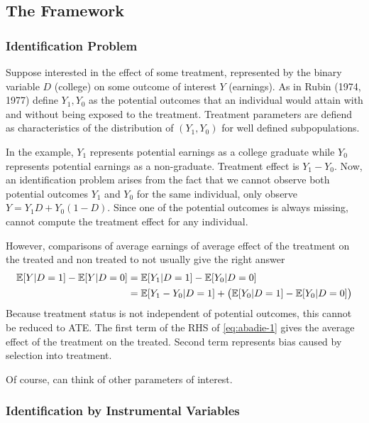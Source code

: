 \subsection{The Framework}
\subsubsection{Identification Problem}

Suppose interested in the effect of some treatment, represented by the binary variable $D$ (college) on some outcome of interest $Y$ (earnings). As in Rubin (1974, 1977) define $Y_1, Y_0$ as the potential outcomes that an individual would attain with and without being exposed to the treatment. Treatment parameters are defiend as characteristics of the distribution of $(Y_1, Y_0)$ for well defined subpopulations. 

In the example, $Y_1$ represents potential earnings as a college graduate while $Y_0$ represents potential earnings as a non-graduate. Treatment effect is $Y_1 - Y_0$. Now, an identification problem arises from the fact that we cannot observe both potential outcomes $Y_1$ and $Y_0$ for the same individual, only observe $Y = Y_1 D + Y_0 (1-D)$. Since one of the potential outcomes is always missing, cannot compute the treatment effect for any individual. 

However, comparisons of average earnings of average effect of the treatment on the treated and non treated to not usually give the right answer
\begin{equation}
	\label{eq:abadie-1}
	\begin{split}
		\mathbb{E}[Y|D=1] - \mathbb{E}[Y | D = 0] &= \mathbb{E}[Y_1 | D= 1] - \mathbb{E}[Y_0 | D=0] \\
								  &= \mathbb{E}[Y_1 - Y_0| D= 1] + \left(\mathbb{E}[Y_0|D=1] -\mathbb{E}[Y_0|D=0]\right)
	\end{split}
\end{equation}
Because treatment status is not independent of potential outcomes, this cannot be reduced to ATE. The first term of the RHS of \eqref{eq:abadie-1} gives the average effect of the treatment on the treated. Second term represents bias caused by selection into treatment. 

Of course, can think of other parameters of interest. 

\subsubsection{Identification by Instrumental Variables}


